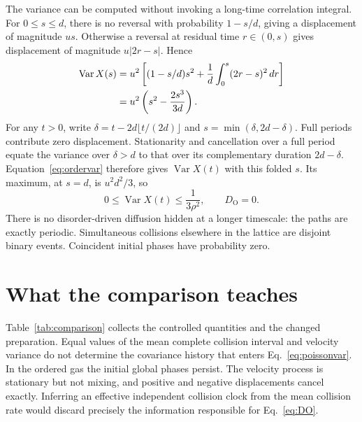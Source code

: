 \documentclass[11pt,a4paper]{article}
\newcommand{\Var}{\operatorname{Var}}
\begin{document}
The variance can be computed without invoking a long-time correlation integral.
For $0\le s\le d$, there is no reversal with probability $1-s/d$, giving
a displacement of magnitude $us$. Otherwise a reversal at residual time
$r\in(0,s)$ gives displacement of magnitude $u|2r-s|$. Hence
\begin{align}
 \Var X(s)&=u^2\left[(1-s/d)s^2+
 \frac{1}{d}\int_0^s(2r-s)^2\,dr\right]\notag\\
 &=u^2\left(s^2-\frac{2s^3}{3d}\right). \label{eq:ordervar}
\end{align}
For any $t>0$, write $\delta=t-2d\lfloor t/(2d)\rfloor$ and
$s=\min(\delta,2d-\delta)$. Full periods contribute zero displacement.
Stationarity and cancellation over a full period equate the variance over
$\delta>d$ to that over its complementary duration $2d-\delta$.
Equation~\eqref{eq:ordervar} therefore gives $\Var X(t)$ with this folded $s$.
Its maximum, at $s=d$, is $u^2d^2/3$, so
\begin{equation}
 0\le\Var X(t)\le\frac{1}{3\rho^2},\qquad D_{\mathrm O}=0. \label{eq:DO}
\end{equation}
There is no disorder-driven diffusion hidden at a longer timescale: the paths
are exactly periodic. Simultaneous collisions elsewhere in the lattice are
disjoint binary events. Coincident initial phases have probability zero.

\section{What the comparison teaches}
Table~\ref{tab:comparison} collects the controlled quantities and the changed
preparation. Equal values of the mean complete collision interval and velocity variance do
not determine the covariance history that enters Eq.~\eqref{eq:poissonvar}.
In the ordered gas the initial global phases persist. The velocity process
is stationary but not mixing, and positive and negative displacements cancel
exactly. Inferring an effective independent collision clock from the mean
collision rate would discard precisely the information responsible for
Eq.~\eqref{eq:DO}.
\end{document}
